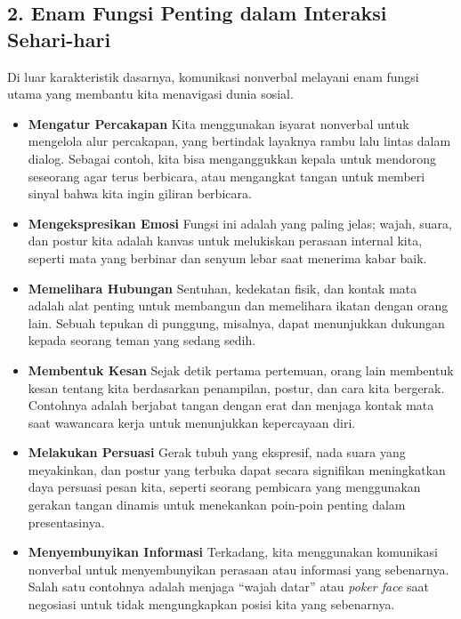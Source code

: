 \documentclass[
  letterpaper,
  DIV=11,
  numbers=noendperiod]{scrreprt}
\begin{document}
\subsection{2. Enam Fungsi Penting dalam Interaksi
Sehari-hari}\label{enam-fungsi-penting-dalam-interaksi-sehari-hari}

Di luar karakteristik dasarnya, komunikasi nonverbal melayani enam
fungsi utama yang membantu kita menavigasi dunia sosial.

\begin{itemize}
\item
  \textbf{Mengatur Percakapan} Kita menggunakan isyarat nonverbal untuk
  mengelola alur percakapan, yang bertindak layaknya rambu lalu lintas
  dalam dialog. Sebagai contoh, kita bisa menganggukkan kepala untuk
  mendorong seseorang agar terus berbicara, atau mengangkat tangan untuk
  memberi sinyal bahwa kita ingin giliran berbicara.
\item
  \textbf{Mengekspresikan Emosi} Fungsi ini adalah yang paling jelas;
  wajah, suara, dan postur kita adalah kanvas untuk melukiskan perasaan
  internal kita, seperti mata yang berbinar dan senyum lebar saat
  menerima kabar baik.
\item
  \textbf{Memelihara Hubungan} Sentuhan, kedekatan fisik, dan kontak
  mata adalah alat penting untuk membangun dan memelihara ikatan dengan
  orang lain. Sebuah tepukan di punggung, misalnya, dapat menunjukkan
  dukungan kepada seorang teman yang sedang sedih.
\item
  \textbf{Membentuk Kesan} Sejak detik pertama pertemuan, orang lain
  membentuk kesan tentang kita berdasarkan penampilan, postur, dan cara
  kita bergerak. Contohnya adalah berjabat tangan dengan erat dan
  menjaga kontak mata saat wawancara kerja untuk menunjukkan kepercayaan
  diri.
\item
  \textbf{Melakukan Persuasi} Gerak tubuh yang ekspresif, nada suara
  yang meyakinkan, dan postur yang terbuka dapat secara signifikan
  meningkatkan daya persuasi pesan kita, seperti seorang pembicara yang
  menggunakan gerakan tangan dinamis untuk menekankan poin-poin penting
  dalam presentasinya.
\item
  \textbf{Menyembunyikan Informasi} Terkadang, kita menggunakan
  komunikasi nonverbal untuk menyembunyikan perasaan atau informasi yang
  sebenarnya. Salah satu contohnya adalah menjaga ``wajah datar'' atau
  \emph{poker face} saat negosiasi untuk tidak mengungkapkan posisi kita
  yang sebenarnya.
\end{itemize}
\end{document}
